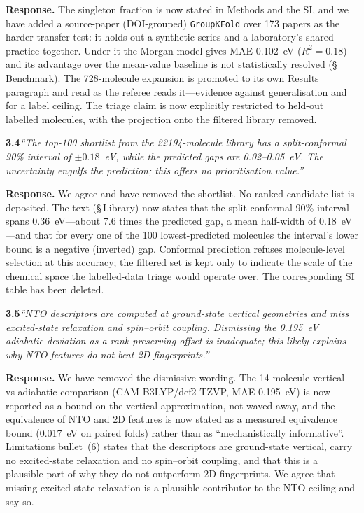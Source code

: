 \documentclass[12pt,a4paper]{letter}
\begin{document}
\smallskip
\noindent\textbf{Response.}
The singleton fraction is now stated in Methods and the SI, and we have added a
source-paper (DOI-grouped) \texttt{GroupKFold} over \num{173} papers as the
harder transfer test: it holds out a synthetic series and a laboratory's shared practice
together. Under it the Morgan model gives MAE \num{0.102}~eV ($R^2 = 0.18$) and
its advantage over the mean-value baseline is not statistically resolved
(\S\,Benchmark). The \num{728}-molecule expansion is promoted to its own Results
paragraph and read as the referee reads it---evidence against generalisation and
for a label ceiling. The triage claim is now explicitly restricted to held-out
labelled molecules, with the projection onto the filtered library removed.

\medskip
\noindent\textbf{3.4}\quad\textit{``The top-100 shortlist from the
\num{22194}-molecule library has a split-conformal \num{90}\% interval of
$\pm\num{0.18}$~eV, while the predicted gaps are \num{0.02}--\num{0.05}~eV. The
uncertainty engulfs the prediction; this offers no prioritisation value.''}

\smallskip
\noindent\textbf{Response.}
We agree and have removed the shortlist. No ranked candidate list is deposited.
The text (\S\,Library) now states that the split-conformal \num{90}\% interval
spans \num{0.36}~eV---about \num{7.6} times the predicted gap, a mean half-width of
\num{0.18}~eV---and that for every one of the \num{100} lowest-predicted molecules the
interval's lower bound is a negative (inverted) gap. Conformal prediction refuses
molecule-level selection at this accuracy; the filtered set is kept only to indicate
the scale of the chemical space the labelled-data triage would operate over. The
corresponding SI table has been deleted.

\medskip
\noindent\textbf{3.5}\quad\textit{``NTO descriptors are computed at ground-state
vertical geometries and miss excited-state relaxation and spin--orbit coupling.
Dismissing the \num{0.195}~eV adiabatic deviation as a rank-preserving offset is
inadequate; this likely explains why NTO features do not beat 2D fingerprints.''}

\smallskip
\noindent\textbf{Response.}
We have removed the dismissive wording. The \num{14}-molecule vertical-vs-adiabatic
comparison (CAM-B3LYP/def2-TZVP, MAE \num{0.195}~eV) is now reported as a bound on
the vertical approximation, not waved away, and the equivalence of NTO and 2D
features is now stated as a measured equivalence bound (\num{0.017}~eV on paired
folds) rather than as ``mechanistically informative''. Limitations bullet~(6) states
that the descriptors are ground-state vertical, carry no excited-state relaxation and
no spin--orbit coupling, and that this is a plausible part of why they do not
outperform 2D fingerprints. We agree that
missing excited-state relaxation is a plausible contributor to the NTO ceiling and
say so.
\end{document}
